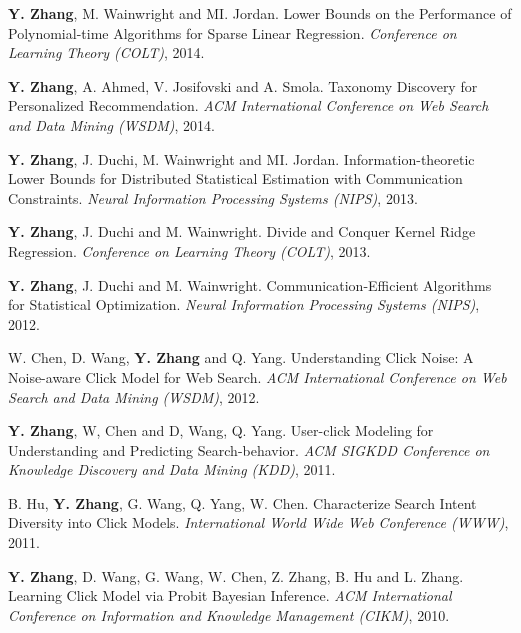 \documentclass{res} %
\begin{document}
\begin{resume}
\begin{enumerate}[label={[C\arabic*]}, ref={C\arabic*}]
\item \textbf{Y. Zhang}, M. Wainwright and MI. Jordan. Lower Bounds on the Performance of Polynomial-time Algorithms for Sparse Linear Regression. \emph{Conference on Learning Theory (COLT)}, 2014. \label{lower-colt14}

\item \textbf{Y. Zhang}, A. Ahmed, V. Josifovski and A. Smola. Taxonomy Discovery for Personalized Recommendation. \emph{ACM International Conference on Web Search and Data Mining (WSDM)}, 2014. \label{taxonomy-wsdm14}

\item \textbf{Y. Zhang}, J. Duchi, M. Wainwright and MI. Jordan. Information-theoretic Lower Bounds for Distributed Statistical Estimation with Communication Constraints.
\emph{Neural Information Processing Systems (NIPS)}, 2013. \label{information-nips13}

\item  \textbf{Y. Zhang}, J. Duchi and M. Wainwright. Divide and Conquer Kernel Ridge Regression.
\emph{Conference on Learning Theory (COLT)}, 2013. \label{divide-colt13}

\item  \textbf{Y. Zhang}, J. Duchi and M. Wainwright. Communication-Efficient Algorithms for Statistical Optimization.
\emph{Neural Information Processing Systems (NIPS)}, 2012. \label{communication-nips12}

\item  W. Chen, D. Wang, \textbf{Y. Zhang} and Q. Yang. Understanding Click Noise: A Noise-aware Click Model for Web Search.
\emph{ACM International Conference on Web Search and Data Mining (WSDM)}, 2012. \label{understanding-wsdm12}

\item  \textbf{Y. Zhang}, W, Chen and D, Wang, Q. Yang. User-click Modeling for Understanding and Predicting Search-behavior.
\emph{ACM SIGKDD Conference on Knowledge Discovery and Data Mining (KDD)}, 2011.\label{user-kdd11}
\item B. Hu, \textbf{Y. Zhang}, G. Wang, Q. Yang, W. Chen. Characterize Search Intent Diversity into Click Models.
\emph{International World Wide Web Conference (WWW)}, 2011. \label{characterize-www11}

\item \textbf{Y. Zhang}, D. Wang, G. Wang, W. Chen, Z. Zhang, B. Hu and L. Zhang. Learning Click Model via Probit Bayesian Inference.
\emph{ACM International Conference on Information and Knowledge Management (CIKM)}, 2010. \label{learning-cikm10}


\end{enumerate}
\end{resume}
\end{document}
